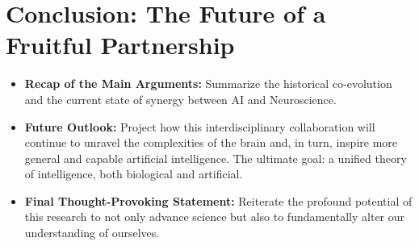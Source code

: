 \section{Conclusion: The Future of a Fruitful Partnership}
\begin{itemize}
    \item \textbf{Recap of the Main Arguments:} Summarize the historical co-evolution and the current state of synergy between AI and Neuroscience.
    \item \textbf{Future Outlook:} Project how this interdisciplinary collaboration will continue to unravel the complexities of the brain and, in turn, inspire more general and capable artificial intelligence. The ultimate goal: a unified theory of intelligence, both biological and artificial.
    \item \textbf{Final Thought-Provoking Statement:} Reiterate the profound potential of this research to not only advance science but also to fundamentally alter our understanding of ourselves.
\end{itemize}

\clearpage